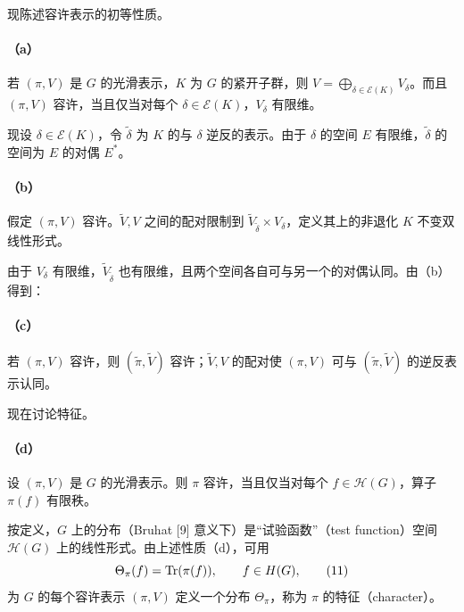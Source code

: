 现陈述容许表示的初等性质。
\paragraph*{（a）}
若 $(\pi,V)$ 是 $G$ 的光滑表示，$K$ 为 $G$ 的紧开子群，则 $V=\bigoplus_{\delta\in\mathcal E(K)}V_\delta$。而且 $(\pi,V)$ 容许，当且仅当对每个 $\delta\in\mathcal E(K)$，$V_\delta$ 有限维。

现设 $\delta\in\mathcal E(K)$，令 $\widetilde\delta$ 为 $K$ 的与 $\delta$ 逆反的表示。由于 $\delta$ 的空间 $E$ 有限维，$\widetilde\delta$ 的空间为 $E$ 的对偶 $E^*$。
\paragraph*{（b）}
假定 $(\pi,V)$ 容许。$\widetilde V,V$ 之间的配对限制到 $\widetilde V_{\widetilde\delta}\times V_\delta$，定义其上的非退化 $K$ 不变双线性形式。

由于 $V_\delta$ 有限维，$\widetilde V_{\widetilde\delta}$ 也有限维，且两个空间各自可与另一个的对偶认同。由（b）得到：
\paragraph*{（c）}
若 $(\pi,V)$ 容许，则 $(\widetilde\pi,\widetilde V)$ 容许；$\widetilde V,V$ 的配对使 $(\pi,V)$ 可与 $(\widetilde\pi,\widetilde V)$ 的逆反表示认同。

现在讨论特征。
\paragraph*{（d）}
设 $(\pi,V)$ 是 $G$ 的光滑表示。则 $\pi$ 容许，当且仅当对每个 $f\in\mathcal H(G)$，算子 $\pi(f)$ 有限秩。

按定义，$G$ 上的分布（Bruhat [9] 意义下）是“试验函数”（test function）空间 $\mathcal H(G)$ 上的线性形式。由上述性质（d），可用
\[
\Theta_\pi(f)=\operatorname{Tr}(\pi(f)),\qquad f\in H(G),\tag{11}
\]
为 $G$ 的每个容许表示 $(\pi,V)$ 定义一个分布 $\Theta_\pi$，称为 $\pi$ 的特征（character）。
